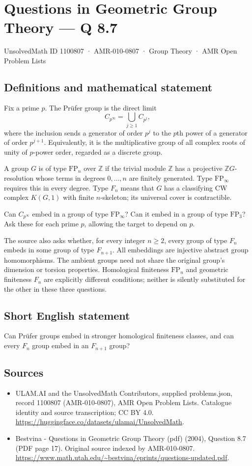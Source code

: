 \documentclass[11pt,a4paper]{article}
\begin{document}
\section*{Questions in Geometric Group Theory — Q 8.7}\label{1100807}
{\small UnsolvedMath ID 1100807 · AMR-010-0807 · Group Theory · AMR Open Problem Lists}
\subsection{Definitions and mathematical statement}
Fix a prime $p$. The Prüfer group is the direct limit
\[
 C_{p^\infty}=\bigcup_{j\geq1}C_{p^j},
\]
where the inclusion sends a generator of order $p^j$ to the $p$th power of a generator of order $p^{j+1}$. Equivalently, it is the multiplicative group of all complex roots of unity of $p$-power order, regarded as a discrete group.

A group $G$ is of type $\mathrm{FP}_n$ over $\mathbb Z$ if the trivial module $\mathbb Z$ has a projective $\mathbb ZG$-resolution whose terms in degrees $0,\ldots,n$ are finitely generated. Type $\mathrm{FP}_\infty$ requires this in every degree. Type $F_n$ means that $G$ has a classifying CW complex $K(G,1)$ with finite $n$-skeleton; its universal cover is contractible.

Can $C_{p^\infty}$ embed in a group of type $\mathrm{FP}_\infty$? Can it embed in a group of type $\mathrm{FP}_3$? Ask these for each prime $p$, allowing the target to depend on $p$.

The source also asks whether, for every integer $n\geq2$, every group of type $F_n$ embeds in some group of type $F_{n+1}$. All embeddings are injective abstract group homomorphisms. The ambient groups need not share the original group's dimension or torsion properties. Homological finiteness $\mathrm{FP}_n$ and geometric finiteness $F_n$ are explicitly different conditions; neither is silently substituted for the other in these three questions.
\subsection{Short English statement}
Can Prüfer groups embed in stronger homological finiteness classes, and can every $F_n$ group embed in an $F_{n+1}$ group?
\subsection{Sources}
\begin{itemize}
\item[S1] ULAM.AI and the UnsolvedMath Contributors, supplied problems.json, record 1100807 (AMR-010-0807), AMR Open Problem Lists. Catalogue identity and source transcription; CC BY 4.0.
\url{https://huggingface.co/datasets/ulamai/UnsolvedMath}.
\item[S2] Bestvina - Questions in Geometric Group Theory (pdf) (2004), Question 8.7 (PDF page 17). Original source indexed by AMR-010-0807.
\url{https://www.math.utah.edu/~bestvina/eprints/questions-updated.pdf}.
\end{itemize}
\end{document}
